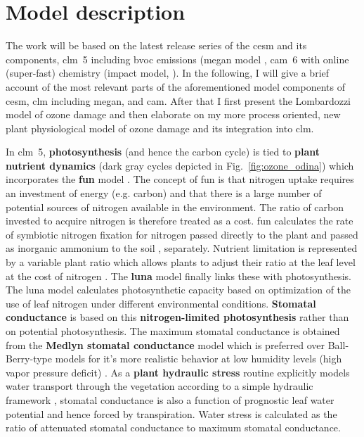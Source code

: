 \section*{Model description}
The work will be based on the latest release series of the \gls{cesm} and its components, \gls{clm}~5 including \gls{bvoc} emissions (\gls{megan} model \parencite{ACP:Guenther2006}, \gls{cam}~6 with online (super-fast) chemistry (\gls{impact} model, \textcite{JGR:Rotman2004}). 
In the following, I will give a brief account of the most relevant parts of the aforementioned model components of \gls{cesm}, \gls{clm} including \gls{megan}, and \gls{cam}. After that I first present the Lombardozzi model of ozone damage and then elaborate on my more process oriented, new plant physiological model of ozone damage and its integration into \gls{clm}.

In \gls{clm}~5, \textbf{photosynthesis} (and hence the carbon cycle) is tied to \textbf{plant nutrient dynamics} (dark gray cycles depicted in Fig.~\ref{fig:ozone_odina}) which incorporates the \textbf{\gls{fun}} model \parencites{GBC:Fisher2010}{JGR:Brzostek2014}{GCB:Shi2015}. The concept of \gls{fun} is that nitrogen uptake requires an investment of energy (e.g. carbon) and that there is a large number of potential sources of nitrogen available in the environment. The ratio of carbon invested to acquire nitrogen is therefore treated as a cost. \gls{fun} calculates the rate of symbiotic nitrogen fixation for nitrogen passed directly to the plant and passed as inorganic ammonium to the soil \parencite{GBC:Cleveland1999}, separately. Nutrient limitation is represented by a variable plant  ratio which allows plants to adjust their  ratio at the leaf level at the cost of nitrogen \parencite{JAMES:Ghimire2016}. The \textbf{\gls{luna}} model \parencites{STE:Xu2019}{GMD:Ali2016} finally links these with photosynthesis. The \gls{luna} model calculates photosynthetic capacity based on optimization of the use of leaf nitrogen under different environmental conditions. \textbf{Stomatal conductance} is based on this \textbf{nitrogen-limited photosynthesis} rather than on potential photosynthesis. The maximum stomatal conductance is obtained from the \textbf{Medlyn stomatal conductance} model \parencite{GCB:Medlyn2011} which is preferred over Ball-Berry-type models \parencite{BallBerry1987} for it’s more realistic behavior at low humidity levels (high vapor pressure deficit) \parencites{PR:Rogers2013}{NP:Rogers2017}.  
As a \textbf{plant hydraulic stress} routine explicitly models water transport through the vegetation according to a simple hydraulic framework \parencite{JAMES:Kennedy2019}, stomatal conductance is also a function of prognostic leaf water potential and hence forced by transpiration. Water stress is calculated as the ratio of attenuated stomatal conductance to maximum stomatal conductance.

